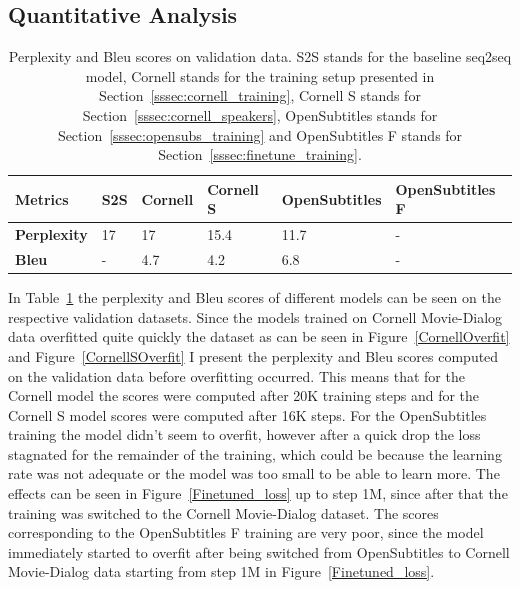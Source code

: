 \documentclass[12pt]{article}
\begin{document}
\subsection{Quantitative Analysis} \label{ssec:51}
\begin{table}[H]
	\centering
	\begin{tabular}{|l|l|l|l|l|l|}
		\hline
		\textbf{Metrics} & \textbf{S2S} & \textbf{Cornell} & \textbf{Cornell S} & \textbf{OpenSubtitles} & \textbf{OpenSubtitles F}\\ \hline
		\textbf{Perplexity} & 17 & 17 & 15.4 & 11.7 & -
		\\ \hline
		\textbf{Bleu} & - & 4.7 & 4.2 & 6.8 & -
		\\ \hline
	\end{tabular}
	\caption{Perplexity and Bleu scores on validation data. S2S stands for the baseline seq2seq model, Cornell stands for the training setup presented in Section~\ref{sssec:cornell_training}, Cornell S stands for Section~\ref{sssec:cornell_speakers}, OpenSubtitles stands for Section~\ref{sssec:opensubs_training} and OpenSubtitles F stands for Section~\ref{sssec:finetune_training}.}	
	\label{table:scores}
\end{table}

In Table~\ref{table:scores} the perplexity and Bleu scores of different models can be seen on the respective validation datasets. Since the models trained on Cornell Movie-Dialog data overfitted quite quickly the dataset as can be seen in Figure~\ref{CornellOverfit} and Figure~\ref{CornellSOverfit} I present the perplexity and Bleu scores computed on the validation data before overfitting occurred. This means that for the Cornell model the scores were computed after 20K training steps and for the Cornell S model scores were computed after 16K steps. For the OpenSubtitles training the model didn't seem to overfit, however after a quick drop the loss stagnated for the remainder of the training, which could be because the learning rate was not adequate or the model was too small to be able to learn more. The effects can be seen in Figure~\ref{Finetuned_loss} up to step 1M, since after that the training was switched to the Cornell Movie-Dialog dataset. The scores corresponding to the OpenSubtitles F training are very poor, since the model immediately started to overfit after being switched from OpenSubtitles to Cornell Movie-Dialog data starting from step 1M in Figure~\ref{Finetuned_loss}.
\end{document}

